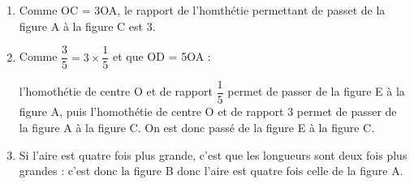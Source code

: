 
\medskip

\begin{enumerate}
\item Comme OC = 3OA, le rapport de l'homthétie permettant de passet de la figure A à la figure C est 3.
\item Comme $\dfrac{3}{5} = 3 \times \dfrac{1}{5}$ et que OD = 5OA :

l'homothétie de centre O et de rapport $\dfrac{1}{5}$ permet de passer de la figure E à la figure A, puis 
l'homothétie de centre O et de rapport $3$ permet de passer de la figure A à la figure C. On est donc passé de la figure E à la figure C.
\item Si l'aire est quatre fois plus grande, c'est que les longueurs sont deux fois plus grandes : c'est donc la figure B donc l'aire est quatre fois celle de la figure A.
\end{enumerate}

\bigskip

